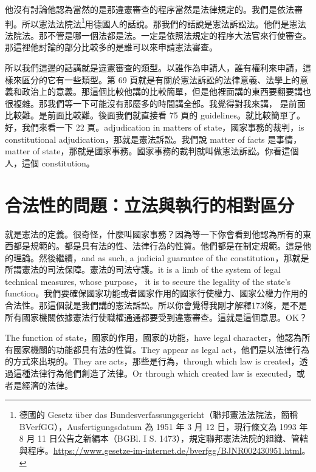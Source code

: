 \hypertarget{w05:cue:40}{}他沒有討論他認為當然的是那違憲審查的程序當然是法律規定的。我們是依法審判。所以憲法法院法\footnote{德國的 Gesetz über das Bundesverfassungsgericht（聯邦憲法法院法，簡稱 BVerfGG），Ausfertigungsdatum 為 1951 年 3 月 12 日，現行條文為 1993 年 8 月 11 日公告之新編本（BGBl. I S. 1473），規定聯邦憲法法院的組織、管轄與程序。\url{https://www.gesetze-im-internet.de/bverfgg/BJNR002430951.html}。}用德國人的話說。那我們的話說是憲法訴訟法。他們是憲法法院法。那不管是哪一個法都是法。一定是依照法規定的程序大法官來行使審查。那這裡他討論的部分比較多的是誰可以來申請憲法審查。

\hypertarget{w05:cue:41}{}所以我們這邊的話講就是違憲審查的類型。以誰作為申請人，誰有權利來申請，這樣來區分的它有一些類型。第 69 頁就是有關於憲法訴訟的法律意義、法學上的意義和政治上的意義。那這個比較他講的比較簡單，但是他裡面講的東西要翻要講也很複雜。那我們等一下可能沒有那麼多的時間講全部。我覺得對我來講，
\hypertarget{w05:cue:42}{}是前面比較難。是前面比較難。後面我們就直接看 75 頁的 guidelines。就比較簡單了。好，我們來看一下 22 頁。adjudication in matters of state，國家事務的裁判，is constitutional adjudication，那就是憲法訴訟。我們說 matter of facts 是事情，matter of state，那就是國家事務。國家事務的裁判就叫做憲法訴訟。你看這個人，這個 constitution。

\section{合法性的問題：立法與執行的相對區分}

\hypertarget{w05:cue:43}{}就是憲法的定義。很奇怪，什麼叫國家事務？因為等一下你會看到他認為所有的東西都是規範的。都是具有法的性、法律行為的性質。他們都是在制定規範。這是他的理論。然後繼續，and as such, a judicial guarantee of the constitution，那就是所謂憲法的司法保障。憲法的司法守護。it is a limb of the system of legal technical measures, whose purpose，
\hypertarget{w05:cue:44}{}it is to secure the legality of the state's function。我們要確保國家功能或者國家作用的國家行使權力、國家公權力作用的合法性。那這個就是我們講的憲法訴訟。所以你會覺得我剛才解釋173條，是不是所有國家機關依據憲法行使職權通通都要受到違憲審查。這就是這個意思。OK？

\hypertarget{w05:cue:45}{}The function of state，國家的作用，國家的功能，have legal character，他認為所有國家機關的功能都具有法的性質。They appear as legal act，他們是以法律行為的方式來出現的。They are acts，那些是行為，through which law is created，透過這種法律行為他們創造了法律。Or through which created law is executed，或者是經濟的法律。

